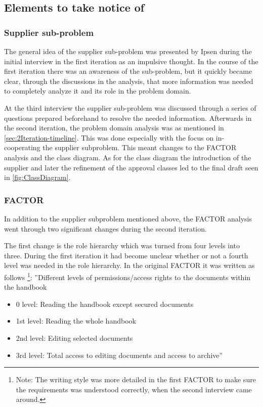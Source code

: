 \subsection{Elements to take notice of}
\subsubsection*{Supplier sub-problem} 
The general idea of the supplier sub-problem was presented by Ipsen during the initial interview in the first iteration as an impulsive thought.
In the course of the first iteration there was an awareness of the sub-problem, but it quickly became clear, through the discussions in the analysis, that more information was needed to completely analyze it and its role in the problem domain.

At the third interview the supplier sub-problem was discussed through a series of questions prepared beforehand to resolve the needed information.
Afterwards in the second iteration, the problem domain analysis was as mentioned in \cref{sec:2Iteration-timeline}. 
This was done especially with the focus on in-cooperating the supplier subproblem.
This meant changes to the FACTOR analysis and the class diagram.
As for the class diagram the introduction of the supplier and later the refinement of the approval classes led to the final draft seen in \cref{fig:ClassDiagram}.

\subsubsection*{FACTOR}
In addition to the supplier subproblem mentioned above, the FACTOR analysis went through two significant changes during the second iteration.

The first change is the role hierarchy which was turned from four levels into three.
During the first iteration it had become unclear whether or not a fourth level was needed in the role hierarchy.
In the original FACTOR it was written as follows
\footnote{Note: The writing style was more detailed in the first FACTOR to make sure the requirements was understood correctly, when the second interview came around.}:
\newline
''Different levels of permissions/access rights to the documents within the handbook
\begin{itemize}
	\item 
	0 level:
	Reading the handbook except secured documents
	\item 
	1st level:
	Reading the whole handbook
	\item 
	2nd level:
	Editing selected documents
	\item 
	3rd level:
	Total access to editing documents and access to archive''
\end{itemize}

